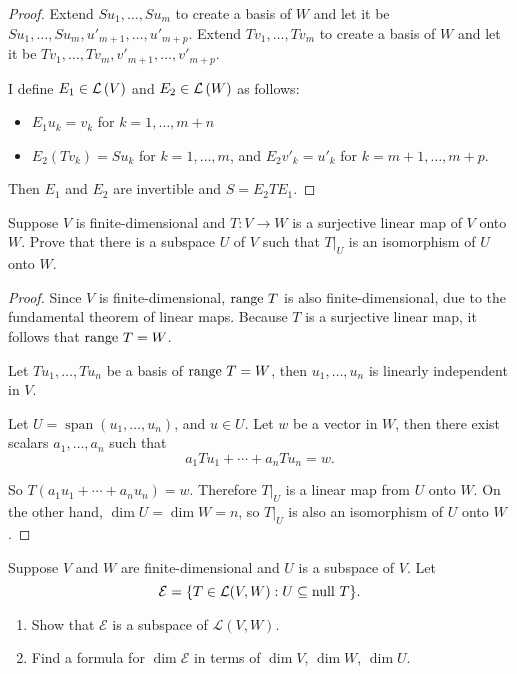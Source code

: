 \begin{proof}
    Extend $Su_{1}, \ldots, Su_{m}$ to create a basis of $W$ and let it be $Su_{1}, \ldots, Su_{m}, u'_{m+1}, \ldots, u'_{m+p}$. Extend $Tv_{1}, \ldots, Tv_{m}$ to create a basis of $W$ and let it be $Tv_{1}, \ldots, Tv_{m}, v'_{m+1}, \ldots, v'_{m+p}$.

    I define $E_{1}\in\mathcal{L}\left({V}\right)$ and $E_{2}\in\mathcal{L}\left({W}\right)$ as follows:
    \begin{itemize}
        \item $E_{1}u_{k} = v_{k}$ for $k = 1, \ldots, m+n$
        \item $E_{2}(Tv_{k}) = Su_{k}$ for $k = 1,\ldots, m$, and $E_{2}v'_{k} = u'_{k}$ for $k = m+1, \ldots, m+p$.
    \end{itemize}

    Then $E_{1}$ and $E_{2}$ are invertible and $S = E_{2}TE_{1}$.
\end{proof}
\newpage

\begin{exercise}
    Suppose $V$ is finite-dimensional and $T: V \to W$ is a surjective linear map of $V$ onto $W$. Prove that there is a subspace $U$ of $V$ such that $T\vert_{U}$ is an isomorphism of $U$ onto $W$.
\end{exercise}

\begin{proof}
    Since $V$ is finite-dimensional, $\operatorname{range}\,{T}$ is also finite-dimensional, due to the fundamental theorem of linear maps. Because $T$ is a surjective linear map, it follows that $\operatorname{range}\,{T} = W$.

    Let $Tu_{1}, \ldots, Tu_{n}$ be a basis of $\operatorname{range}\,{T} = W$, then $u_{1}, \ldots, u_{n}$ is linearly independent in $V$.

    Let $U = \operatorname{span}(u_{1}, \ldots, u_{n})$, and $u\in U$. Let $w$ be a vector in $W$, then there exist scalars $a_{1}, \ldots, a_{n}$ such that
    \[
        a_{1}Tu_{1} + \cdots + a_{n}Tu_{n} = w.
    \]

    So $T(a_{1}u_{1} + \cdots + a_{n}u_{n}) = w$. Therefore $T\vert_{U}$ is a linear map from $U$ onto $W$. On the other hand, $\dim U = \dim W = n$, so $T\vert_{U}$ is also an isomorphism of $U$ onto $W$.
\end{proof}
\newpage

\begin{exercise}
    Suppose $V$ and $W$ are finite-dimensional and $U$ is a subspace of $V$. Let
    \[
        \mathcal{E} = \{ T\in\mathcal{L}(V, W): U\subseteq \operatorname{null}\,{T} \}.
    \]

    \begin{enumerate}[label={(\alph*)}]
        \item Show that $\mathcal{E}$ is a subspace of $\mathcal{L}(V, W)$.
        \item Find a formula for $\dim\mathcal{E}$ in terms of $\dim V$, $\dim W$, $\dim U$.
    \end{enumerate}
\end{exercise}

